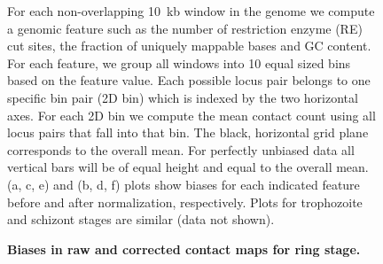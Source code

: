 \documentclass{article}
\begin{document}
\begin{figure}
  \begin{center}
   \hspace{0.03\textwidth}
  \newline
   \hspace{0.03\textwidth}
  \newline
   \hspace{0.03\textwidth}
  \end{center}
  \caption{{\bf  Biases in raw and corrected contact maps for ring stage.}}
{ For each non-overlapping 10~kb window in the genome we compute a genomic feature such as
  the number of restriction enzyme (RE) cut sites, the fraction of uniquely mappable bases and GC content.
  For each feature, we group all windows into 10 equal sized bins based on the feature value.
  Each possible locus pair belongs to one specific bin pair (2D bin) which is indexed by the two
  horizontal axes. For each 2D bin we compute the mean contact count using all locus pairs that fall
  into that bin. The black, horizontal grid plane corresponds to the overall mean.
  For perfectly unbiased data all vertical bars will be of equal height and equal to the overall mean.
  (a, c, e) and (b, d, f) plots show biases for each indicated feature before and after normalization,
  respectively. Plots for trophozoite and schizont stages are similar (data not shown).}
\label{suppfig:ICE}
\end{figure}
\clearpage
\end{document}
